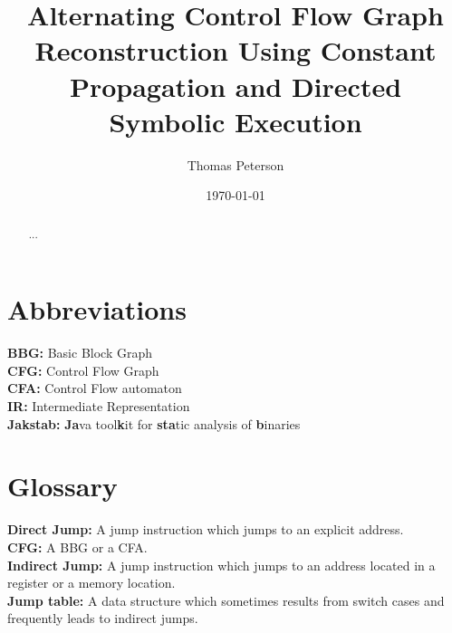 \documentclass{kththesis}
\title{Alternating Control Flow Graph Reconstruction Using Constant Propagation and Directed Symbolic Execution}
\author{Thomas Peterson}
\date{\today}
\newcommand{\MONTH}{%
  \ifcase\the\month
  \or January %
  \or February %
  \or March %
  \or April %
  \or May %
  \or June %
  \or July %
  \or August %
  \or September %
  \or October %
  \or November %
  \or December %
  \fi}
\renewcommand{\it}[1]{\textit{#1}}
\begin{document}
\frontmatter

\titlepage

\begin{abstract}
\end{abstract}


\begin{otherlanguage}{swedish}
  \begin{abstract}
    ...
  \end{abstract}
\end{otherlanguage}

\tableofcontents
\thispagestyle{empty}

\clearpage
\thispagestyle{empty}
\section*{Abbreviations}
\textbf{BBG:} Basic Block Graph\\
\textbf{CFG:} Control Flow Graph\\
\textbf{CFA:} Control Flow automaton\\
\textbf{IR:} Intermediate Representation\\
\textbf{Jakstab:} \textbf{Ja}va tool\textbf{k}it for \textbf{sta}tic analysis of \textbf{b}inaries\\

\clearpage
\thispagestyle{empty}
\section*{Glossary}
\textbf{Direct Jump:} A jump instruction which jumps to an explicit address.\\
\textbf{CFG:} A BBG or a CFA.\\
\textbf{Indirect Jump:} A jump instruction which jumps to an address located in a register or a memory location.\\
\textbf{Jump table:} A data structure which sometimes results from switch cases and frequently leads to indirect jumps. \\
\end{document}
